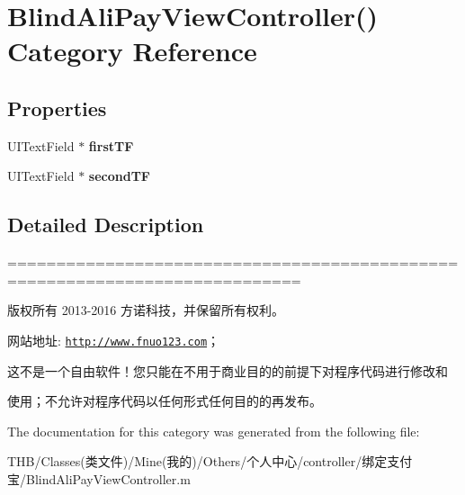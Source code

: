 \hypertarget{category_blind_ali_pay_view_controller_07_08}{}\section{Blind\+Ali\+Pay\+View\+Controller() Category Reference}
\label{category_blind_ali_pay_view_controller_07_08}
\subsection*{Properties}
\begin{DoxyCompactItemize}
\item 
\mbox{\label{category_blind_ali_pay_view_controller_07_08_ac1699cedac2b2b2ef1b483401215ec15}} 
U\+I\+Text\+Field $\ast$ {\bfseries first\+TF}
\item 
\mbox{\label{category_blind_ali_pay_view_controller_07_08_a31f1481ac07a612158cf2536ac9f4ded}} 
U\+I\+Text\+Field $\ast$ {\bfseries second\+TF}
\end{DoxyCompactItemize}


\subsection{Detailed Description}
============================================================================

版权所有 2013-\/2016 方诺科技，并保留所有权利。

网站地址\+: \href{http://www.fnuo123.com}{\tt http\+://www.\+fnuo123.\+com}； 



这不是一个自由软件！您只能在不用于商业目的的前提下对程序代码进行修改和

使用；不允许对程序代码以任何形式任何目的的再发布。 

 

The documentation for this category was generated from the following file\+:\begin{DoxyCompactItemize}
\item 
T\+H\+B/\+Classes(类文件)/\+Mine(我的)/\+Others/个人中心/controller/绑定支付宝/Blind\+Ali\+Pay\+View\+Controller.\+m\end{DoxyCompactItemize}
